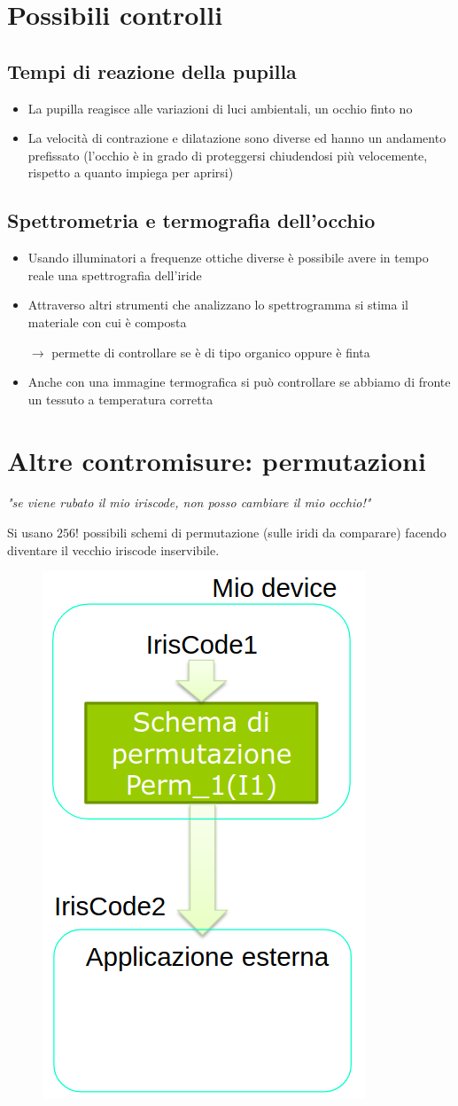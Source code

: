 \documentclass{report}
\begin{document}
\section{Possibili controlli}

\subsection{Tempi di reazione della pupilla}
\begin{itemize}
    \item La pupilla reagisce alle variazioni di luci ambientali, un occhio finto no 
    \item La velocità di contrazione e dilatazione sono diverse ed hanno un andamento prefissato (l'occhio 
    è in grado di proteggersi chiudendosi più velocemente, rispetto a quanto impiega per aprirsi)
\end{itemize}

\subsection{Spettrometria e termografia dell'occhio}
\begin{itemize}
    \item Usando illuminatori a frequenze ottiche diverse è possibile avere in tempo reale una spettrografia dell'iride 
    \item Attraverso altri strumenti che analizzano lo spettrogramma si stima il materiale con cui è composta 
    
    $\rightarrow$ permette di controllare se è di tipo organico oppure è finta
    \item Anche con una immagine termografica si può controllare se abbiamo di fronte 
    un tessuto a temperatura corretta
\end{itemize}

\section{Altre contromisure: permutazioni}
\textit{"se viene rubato il mio iriscode, non posso cambiare il mio occhio!"}

\noindent Si usano $256!$ possibili schemi di permutazione (sulle iridi da
comparare) facendo diventare il vecchio iriscode inservibile.

\begin{figure}[ht]
    \centering
    \includegraphics[width=0.3\linewidth]{images/permutazioni.png}
\end{figure}
\end{document}
